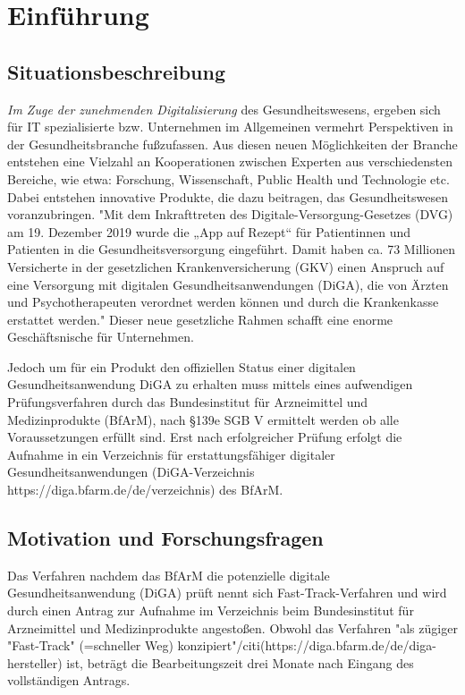 \section{Einführung}
\subsection{Situationsbeschreibung}
\emph{Im Zuge der zunehmenden Digitalisierung} des Gesundheitswesens, ergeben sich für IT spezialisierte bzw. Unternehmen im Allgemeinen vermehrt Perspektiven in der Gesundheitsbranche fußzufassen. 
Aus diesen neuen Möglichkeiten der Branche entstehen eine Vielzahl an Kooperationen zwischen Experten aus verschiedensten Bereiche, wie etwa: Forschung, Wissenschaft, Public Health und Technologie etc. Dabei entstehen innovative Produkte, die dazu beitragen, das Gesundheitswesen voranzubringen. "Mit dem Inkrafttreten des Digitale-Versorgung-Gesetzes (DVG) am 19. Dezember 2019 wurde die „App auf Rezept“ für Patientinnen und Patienten in die Gesundheitsversorgung eingeführt. 
Damit haben ca. 73 Millionen Versicherte in der gesetzlichen Krankenversicherung (GKV) einen Anspruch auf eine Versorgung mit digitalen Gesundheitsanwendungen (DiGA), die von Ärzten und Psychotherapeuten verordnet werden können und durch die Krankenkasse erstattet werden."%
Dieser neue gesetzliche Rahmen schafft eine enorme Geschäftsnische für Unternehmen. 

Jedoch um für ein Produkt den offiziellen Status einer digitalen Gesundheitsanwendung DiGA zu erhalten muss mittels eines aufwendigen Prüfungsverfahren durch das Bundesinstitut für Arzneimittel und Medizinprodukte (BfArM), nach §139e SGB V ermittelt werden ob alle Voraussetzungen erfüllt sind. Erst nach erfolgreicher Prüfung erfolgt die Aufnahme in ein Verzeichnis für erstattungsfähiger digitaler Gesundheitsanwendungen (DiGA-Verzeichnis https://diga.bfarm.de/de/verzeichnis) des BfArM.

\subsection{Motivation und Forschungsfragen}
Das Verfahren nachdem das BfArM die potenzielle digitale Gesundheitsanwendung (DiGA) prüft nennt sich Fast-Track-Verfahren und wird durch einen Antrag zur Aufnahme im Verzeichnis beim Bundesinstitut für Arzneimittel und Medizinprodukte angestoßen. Obwohl das Verfahren "als zügiger "Fast-Track" (=schneller Weg) konzipiert"/citi(https://diga.bfarm.de/de/diga-hersteller) ist, beträgt die Bearbeitungszeit drei Monate nach Eingang des vollständigen Antrags.

